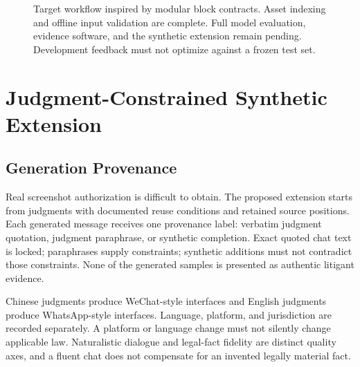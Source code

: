 \documentclass[11pt]{article}
\begin{document}
\begin{figure}[t]
\centering
{}
\caption{Target workflow inspired by modular block contracts. Asset indexing and offline input validation are complete. Full model evaluation, evidence software, and the synthetic extension remain pending. Development feedback must not optimize against a frozen test set.}
\label{fig:workflow}
\end{figure}

\section{Judgment-Constrained Synthetic Extension}
\subsection{Generation Provenance}
Real screenshot authorization is difficult to obtain. The proposed extension starts from judgments with documented reuse conditions and retained source positions. Each generated message receives one provenance label: verbatim judgment quotation, judgment paraphrase, or synthetic completion. Exact quoted chat text is locked; paraphrases supply constraints; synthetic additions must not contradict those constraints. None of the generated samples is presented as authentic litigant evidence.

Chinese judgments produce WeChat-style interfaces and English judgments produce WhatsApp-style interfaces. Language, platform, and jurisdiction are recorded separately. A platform or language change must not silently change applicable law. Naturalistic dialogue and legal-fact fidelity are distinct quality axes, and a fluent chat does not compensate for an invented legally material fact.
\end{document}
